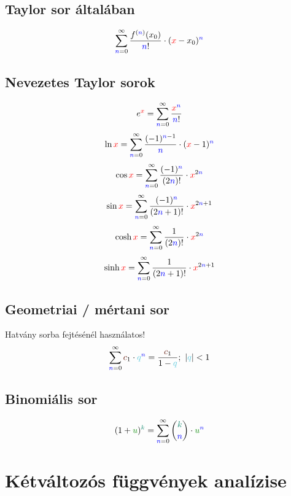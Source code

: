 \documentclass[a4paper,12pt]{article}
\begin{document}
\subsection{Taylor sor általában}

\begin{equation}
\sumi \frac{f^{(\n)}(x_0)}{\n!} \cdot (\x-x_0)^{\n}
\end{equation}

\subsection{Nevezetes Taylor sorok}
\begin{equation}
e^{\x} = \sumi \frac{{\x}^{\n}}{\n!}
\end{equation}
\begin{equation}
\ln \x = \sumi \frac{(-1)^{\n-1}}{\n} \cdot (\x-1)^{\n}
\end{equation}
\begin{equation}
\cos \x = \sumi \frac{(-1)^{\n}}{(2\n)!} \cdot \x^{2\n}
\end{equation}
\begin{equation}
\sin \x = \sumi \frac{(-1)^{\n}}{(2\n+1)!} \cdot \x^{2\n+1}
\end{equation}
\begin{equation}
\cosh \x = \sumi \frac{1}{(2\n)!} \cdot \x^{2\n}
\end{equation}
\begin{equation}
\sinh \x = \sumi \frac{1}{(2\n+1)!} \cdot \x^{2\n+1}
\end{equation}

\subsection{Geometriai / mértani sor}
Hatvány sorba fejtésénél használatos!
\begin{equation}
\sumi \c_1 \cdot \q^{\n} = \frac{\c_1}{1-\q};\ |\q| < 1
\end{equation}

\subsection{Binomiális sor}
\begin{equation}
  (1+\u)^{\k} = \sumi \binom{\k}{\n} \cdot {\u}^{\n}
\end{equation}

\section{Kétváltozós függvények analízise}
\end{document}
